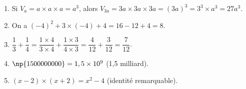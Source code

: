 
\medskip

\begin{enumerate}
\item Si $V_a = a \times a \times a = a^3$, alors $V_{3a} =  3a \times 3a \times 3a = (3a)^3 = 3^3 \times a^3 = 27a^3$.
\item On a $(- 4)^2 + 3\times (- 4) + 4 = 16  - 12 + 4 = 8$.
\item $\dfrac{1}{3} + \dfrac{1}{4} = \dfrac{1\times 4}{3\times 4} + \dfrac{1\times 3}{4\times 3} = \dfrac{4}{12} + \dfrac{3}{12} = \dfrac{7}{12}$.
\item $\np{1500000000} = 1,5 \times 10^9$ (1,5 milliard).
\item $(x - 2)\times (x + 2) = x^2 - 4$ (identité remarquable).

\end{enumerate}

\bigskip


